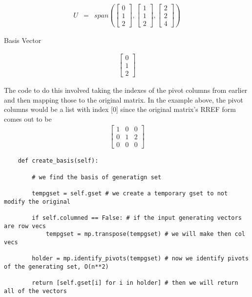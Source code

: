 \documentclass[12pt, a4paper]{article}
\begin{document}
\begin{eqnarray*}
    U &=& span(\begin{bmatrix}
        0 \\
        1 \\
        2
    \end{bmatrix}, 
    \begin{bmatrix}
        1 \\
        1 \\
        2 
    \end{bmatrix},
    \begin{bmatrix}
        2 \\
        2 \\
        4
    \end{bmatrix})
\end{eqnarray*}

Basis Vector

\begin{eqnarray*}
    \begin{bmatrix}
        0 \\
        1 \\
        2
    \end{bmatrix}
\end{eqnarray*}

The code to do this involved taking the indexes of the pivot columns from earlier and then mapping those to the original matrix.
In the example above, the pivot columns would be a list with index [0] since the original matrix's RREF form comes out to be 
\begin{eqnarray}
    \begin{bmatrix}
        1 & 0 & 0 \\
        0 & 1 & 2 \\
        0 & 0 & 0
    \end{bmatrix}
\end{eqnarray}

\begin{lstlisting}
    def create_basis(self): 

        # we find the basis of generatign set

        tempgset = self.gset # we create a temporary gset to not modify the original

        if self.columned == False: # if the input generating vectors are row vecs
            tempgset = mp.transpose(tempgset) # we will make then col vecs

        holder = mp.identify_pivots(tempgset) # now we identify pivots of the generating set, O(n**2)

        return [self.gset[i] for i in holder] # then we will return all of the vectors
\end{lstlisting}
\end{document}
